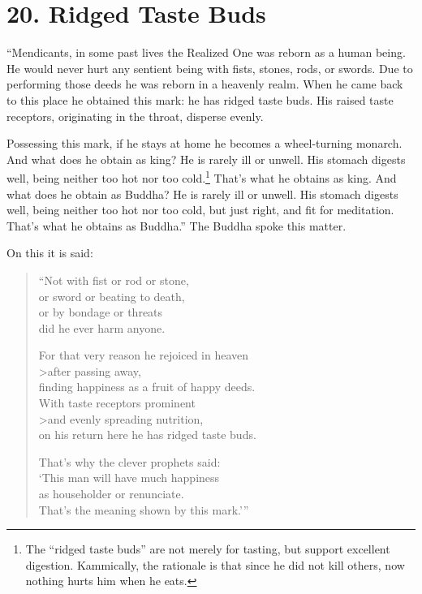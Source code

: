 \documentclass[12pt,openany]{book}%
\begin{document}
\section*{20. Ridged Taste Buds }

“Mendicants, in some past lives the Realized One was reborn as a human being. He would never hurt any sentient being with fists, stones, rods, or swords. Due to performing those deeds he was reborn in a heavenly realm. When he came back to this place he obtained this mark: he has ridged taste buds. His raised taste receptors, originating in the throat, disperse evenly. 

Possessing this mark, if he stays at home he becomes a wheel-turning monarch. And what does he obtain as king? He is rarely ill or unwell. His stomach digests well, being neither too hot nor too cold.\footnote{The “ridged taste buds” are not merely for tasting, but support excellent digestion. Kammically, the rationale is that since he did not kill others, now nothing hurts him when he eats. } That’s what he obtains as king. And what does he obtain as Buddha? He is rarely ill or unwell. His stomach digests well, being neither too hot nor too cold, but just right, and fit for meditation. That’s what he obtains as Buddha.” The Buddha spoke this matter. 

On this it is said: 

\begin{verse}%
“Not with fist or rod or stone, \\
or sword or beating to death, \\
or by bondage or threats \\
did he ever harm anyone. 

For that very reason he rejoiced in heaven \\>after passing away, \\
finding happiness as a fruit of happy deeds. \\
With taste receptors prominent \\>and evenly spreading nutrition, \\
on his return here he has ridged taste buds. 

That’s why the clever prophets said: \\
‘This man will have much happiness \\
as householder or renunciate. \\
That’s the meaning shown by this mark.’” 

%
\end{verse}
\end{document}
